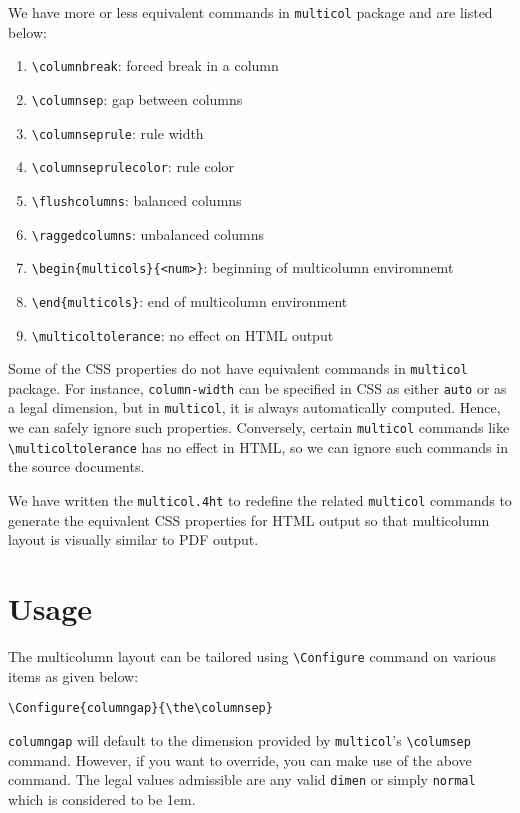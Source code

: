 \documentclass{article}
\begin{document}
We have more or less equivalent commands in \texttt{multicol} package and
are listed below:

\begin{enumerate}
\item \texttt{\textbackslash{}columnbreak}: forced break in a column
\item \texttt{\textbackslash{}columnsep}: gap between columns
\item \texttt{\textbackslash{}columnseprule}: rule width
\item \texttt{\textbackslash{}columnseprulecolor}: rule color
\item \texttt{\textbackslash{}flushcolumns}: balanced columns
\item \texttt{\textbackslash{}raggedcolumns}: unbalanced columns
\item \texttt{\textbackslash{}begin\{multicols\}\{<num>\}}: beginning of
        multicolumn enviromnemt
\item \texttt{\textbackslash{}end\{multicols\}}: end of multicolumn environment
\item \texttt{\textbackslash{}multicoltolerance}: no effect on HTML output
\end{enumerate}

Some of the CSS properties do not have equivalent commands in
\texttt{multicol} package. For instance, \texttt{column-width} can be
specified in CSS as either \texttt{auto} or as a legal dimension, but
in \texttt{multicol}, it is always automatically computed. Hence, we
can safely ignore such properties. Conversely, certain
\texttt{multicol} commands like
\texttt{\textbackslash{}multicoltolerance} has no effect in HTML, so
we can ignore such commands in the source documents.

We have written the \texttt{multicol.4ht} to redefine the related
\texttt{multicol} commands to generate the equivalent CSS properties
for HTML output so that multicolumn layout is visually similar to PDF
output.

\section*{Usage}
\label{sec-3}

The multicolumn layout can be tailored using
\texttt{\textbackslash{}Configure} command on various items as given
below:

\begin{verbatim}
\Configure{columngap}{\the\columnsep}
\end{verbatim}
\texttt{columngap} will default to the dimension provided by
\texttt{multicol}'s \texttt{\textbackslash{}columsep}
command. However, if you want to override, you can make use of the
above command. The legal values admissible are any valid
\texttt{dimen} or simply \texttt{normal} which is considered to be
1em.
\end{document}
